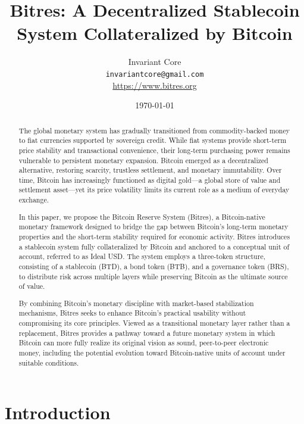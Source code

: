 \documentclass{article}
\title{Bitres: A Decentralized Stablecoin System Collateralized by Bitcoin}
\author{Invariant Core\\
\texttt{invariantcore@gmail.com}\\
\url{https://www.bitres.org}}
\date{\today}
\begin{document}
\maketitle

\begin{abstract}
The global monetary system has gradually transitioned from commodity-backed money to fiat currencies supported by sovereign credit. While fiat systems provide short-term price stability and transactional convenience, their long-term purchasing power remains vulnerable to persistent monetary expansion. Bitcoin emerged as a decentralized alternative, restoring scarcity, trustless settlement, and monetary immutability. Over time, Bitcoin has increasingly functioned as digital gold---a global store of value and settlement asset---yet its price volatility limits its current role as a medium of everyday exchange.

In this paper, we propose the Bitcoin Reserve System (Bitres), a Bitcoin-native monetary framework designed to bridge the gap between Bitcoin's long-term monetary properties and the short-term stability required for economic activity. Bitres introduces a stablecoin system fully collateralized by Bitcoin and anchored to a conceptual unit of account, referred to as Ideal USD. The system employs a three-token structure, consisting of a stablecoin (BTD), a bond token (BTB), and a governance token (BRS), to distribute risk across multiple layers while preserving Bitcoin as the ultimate source of value.

By combining Bitcoin's monetary discipline with market-based stabilization mechanisms, Bitres seeks to enhance Bitcoin's practical usability without compromising its core principles. Viewed as a transitional monetary layer rather than a replacement, Bitres provides a pathway toward a future monetary system in which Bitcoin can more fully realize its original vision as sound, peer-to-peer electronic money, including the potential evolution toward Bitcoin-native units of account under suitable conditions.
\end{abstract}


\section{Introduction}
\end{document}
